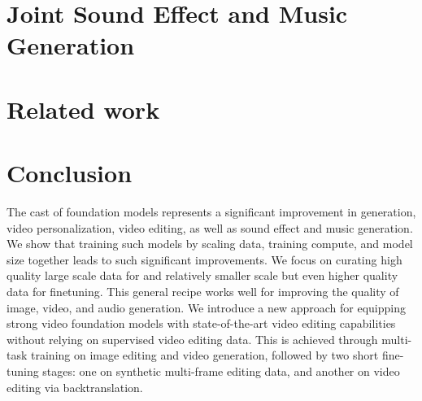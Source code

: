\documentclass[]{fairmeta}
\begin{document}
\section{Joint Sound Effect and Music Generation}
\label{sec:audio_model}




\section{Related work}






\section{Conclusion}

The \OURS cast of foundation models represents a significant improvement in \textToV generation, video personalization, video editing, as well as sound effect and music generation.
We show that training such models by scaling data, training compute, and model size together leads to such significant improvements.
We focus on curating high quality large scale data for \pretraining and relatively smaller scale but even higher quality data for finetuning.
This general recipe works well for improving the quality of image, video, and audio generation.
We introduce a new approach for equipping strong video foundation models with state-of-the-art video editing capabilities without relying on supervised video editing data. This is achieved through multi-task training on image editing and video generation, followed by two short fine-tuning stages: one on synthetic multi-frame editing data, and another on video editing via backtranslation.
\end{document}
